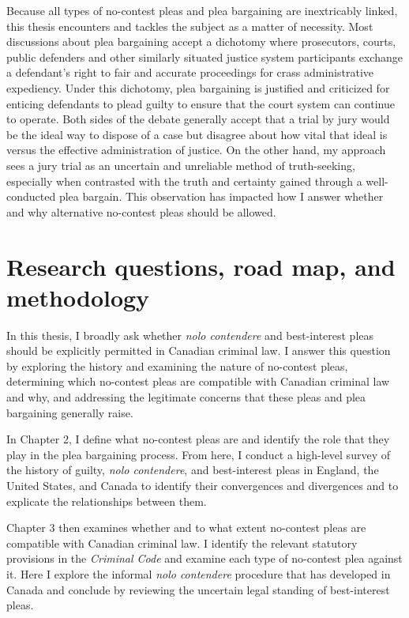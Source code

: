 Because all types of no-contest pleas and plea bargaining are inextricably linked, this thesis encounters and tackles the subject as a matter of necessity. Most discussions about plea bargaining accept a dichotomy where prosecutors, courts, public defenders and other similarly situated justice system participants exchange a defendant's right to fair and accurate proceedings for crass administrative expediency. Under this dichotomy, plea bargaining is justified and criticized for enticing defendants to plead guilty to ensure that the court system can continue to operate. Both sides of the debate generally accept that a trial by jury would be the ideal way to dispose of a case but disagree about how vital that ideal is versus the effective administration of justice. On the other hand, my approach sees a jury trial as an uncertain and unreliable method of truth-seeking, especially when contrasted with the truth and certainty gained through a well-conducted plea bargain. This observation has impacted how I answer whether and why alternative no-contest pleas should be allowed.

\section{Research questions, road map, and methodology}

In this thesis, I broadly ask whether \textit{nolo contendere} and best-interest pleas should be explicitly permitted in Canadian criminal law. I answer this question by exploring the history and examining the nature of no-contest pleas, determining which no-contest pleas are compatible with Canadian criminal law and why, and addressing the legitimate concerns that these pleas and plea bargaining generally raise.

In Chapter 2, I define what no-contest pleas are and identify the role that they play in the plea bargaining process. From here, I conduct a high-level survey of the history of guilty, \textit{nolo contendere}, and best-interest pleas in England, the United States, and Canada to identify their convergences and divergences and to explicate the relationships between them. 

Chapter 3 then examines whether and to what extent no-contest pleas are compatible with Canadian criminal law. I identify the relevant statutory provisions in the \textit{Criminal Code} and examine each type of no-contest plea against it. Here I explore the informal \textit{nolo contendere} procedure that has developed in Canada and conclude by reviewing the uncertain legal standing of best-interest pleas.

